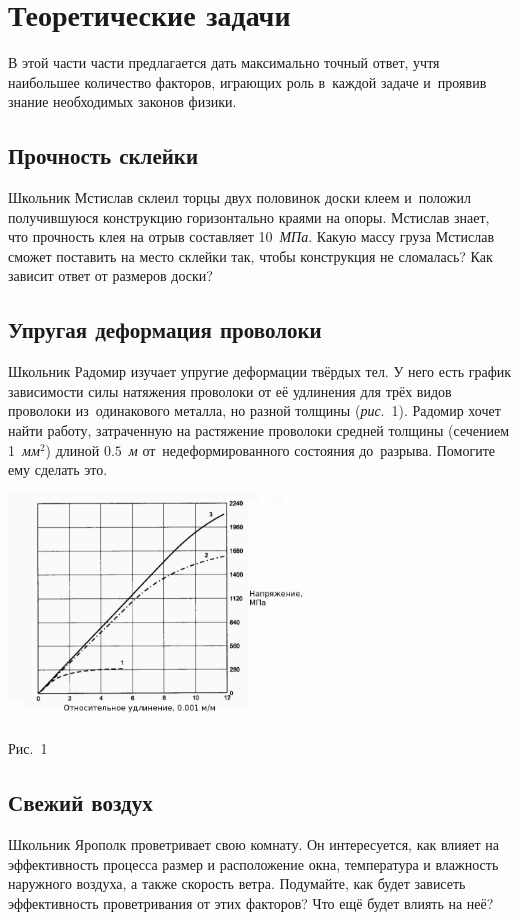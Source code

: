 \documentclass[a4paper,12pt]{article}
\begin{document}
\section{Теоретические задачи}

В этой части части предлагается
дать максимально точный ответ, учтя наибольшее количество факторов, играющих роль в~каждой
задаче и~проявив знание необходимых законов физики.

\subsection{Прочность склейки}
Школьник Мстислав склеил торцы двух половинок доски клеем и~положил получившуюся конструкцию
горизонтально краями на опоры. Мстислав знает, что прочность клея на отрыв составляет 10~\emph{МПа}.
Какую массу груза Мстислав сможет поставить на место склейки так, чтобы конструкция не сломалась?
Как зависит ответ от размеров доски?

\subsection{Упругая деформация проволоки}
Школьник Радомир изучает упругие деформации твёрдых тел. У него есть график зависимости силы
натяжения проволоки от её удлинения для трёх видов проволоки из~одинакового металла, но
разной толщины (\emph{рис}.~1). Радомир хочет найти работу, затраченную на растяжение проволоки
средней толщины (сечением 1~\emph{мм}${}^2$) длиной $0.5$~\emph{м}
от~недеформированного состояния до~разрыва. Помогите ему сделать это.

\medskip
\centerline{\includegraphics[height=60mm]{tension.png}}
\medskip
\centerline{\small Рис.~1}

\subsection{Свежий воздух}
Школьник Ярополк проветривает свою комнату. Он интересуется, как влияет на эффективность процесса
размер и расположение окна, температура и влажность наружного воздуха, а также скорость ветра.
Подумайте, как будет зависеть эффективность проветривания от этих факторов?
Что ещё будет влиять на неё?
\end{document}
